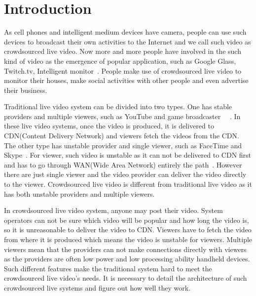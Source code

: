 
\section{Introduction}
\label{sec:introduction}

 As cell phones and intelligent medium devices have camera, people can use such devices to broadcast their own activities to the Internet and we call such video as crowdsourced live video. Now more and more people have involved in the such kind of video as the emergence of popular application, such as Google Glass, Twitch.tv, Intelligent monitor~\cite{ishimaru2014blink}. People make use of crowdsourced live video to monitor their houses, make social activities with other people and even advertise their business. 
 
 Traditional live video system can be divided into two types. One has stable providers and multiple viewers, such as YouTube and game broadcaster~\cite{Mukerjee2014CDNvideo} ~\cite{yin2009livesky}. In these live video systems, once the video is produced, it is delivered to CDN(Content Delivery Network) and viewers fetch the videos from the CDN. The other type has unstable provider and single viewer, such as FaceTime and Skype~\cite{Xu2012skype}. For viewer, such video is unstable as it can not be delivered to CDN first and has to go through WAN(Wide Area Network) entirely the path~\cite{Benson2010DCN}. However there are just single viewer and the video provider can deliver the video directly to the viewer. Crowdsourced live video is different from traditional live video as it has both unstable providers and multiple viewers.
 
 In crowdsourced live video system, anyone may post their video. System operators can not be sure which video will be popular and how long the video is, so it is unreasonable to deliver  the video to CDN. Viewers have to fetch the video from where it is produced which means the video is unstable for viewers. Multiple viewers mean that the providers can not make connections directly with viewers as the providers are often low power and low processing ability handheld devices. Such different features make the traditional system hard to meet the crowdsourced live video's needs. It is necessary to detail the architecture of such crowdsourced live systems and figure out how well they work.

